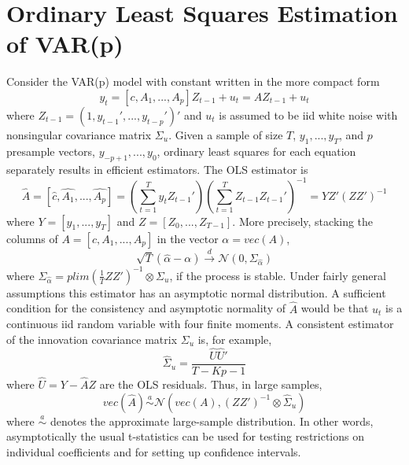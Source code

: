 \documentclass[a4paper]{scrartcl}
\begin{document}
    \section{Ordinary Least Squares Estimation of VAR(p)}
    Consider the VAR(p) model with constant written in the more compact form
    $$ y_t = [c, A_1, ..., A_p] Z_{t-1} + u_t = A Z_{t-1}+ u_t$$
    where $Z_{t-1}=(1,y_{t-1}',...,y_{t-p}')'$ and $u_t$ is assumed to be iid white noise with nonsingular covariance matrix $\Sigma_u$. Given a sample of size $T$, $y_1,...,y_T$, and $p$ presample vectors, $y_{-p+1},...,y_{0}$, ordinary least squares for each equation separately results in efficient estimators. The OLS estimator is
    $$\hat{A} = \left[ \hat{c}, \hat{A_1},...,\hat{A_p}\right] = \left(\sum_{t=1}^{T}y_t Z_{t-1}'\right)\left(\sum_{t=1}^{T}Z_{t-1}Z_{t-1}'\right)^{-1} = Y Z'(ZZ')^{-1}$$
    where $Y=[y_1,...,y_T]$ and $Z=[Z_0,...,Z_{T-1}]$. More precisely, stacking the columns of $A = [c, A_1,...,A_p]$ in the vector $\alpha = vec(A)$,
    $$\sqrt{T}\left(\hat{\alpha} - \alpha \right) \overset{d}{\rightarrow} \mathcal{N}(0, \Sigma_{\hat{\alpha}})$$
    where $\Sigma_{\hat{\alpha}} = plim(\frac{1}{T}ZZ')^{-1}\otimes \Sigma_u$, if the process is stable. Under fairly general assumptions this estimator has an asymptotic normal distribution. A sufficient condition for the consistency and asymptotic normality of $\hat{A}$ would be that $u_t$ is a continuous iid random variable with four finite moments. A consistent estimator of the innovation covariance matrix $\Sigma_u$ is, for example,
    $$\hat{\Sigma}_u = \frac{\hat{U}\hat{U}'}{T-Kp-1}$$
    where $\hat{U} = Y - \hat{A}Z$ are the OLS residuals. Thus, in large samples,
    $$vec(\hat{A}) \overset{a}{\sim}\mathcal{N}(vec(A),(ZZ')^{-1}\otimes \hat{\Sigma}_u)$$
    where $\overset{a}{\sim}$  denotes the approximate large-sample distribution. In other words,
    asymptotically the usual t-statistics can be used for testing restrictions on individual coefficients and for setting up confidence intervals.
\end{document}
